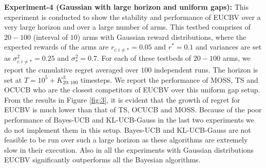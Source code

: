 \textbf{Experiment-4 (Gaussian with large horizon and uniform gaps):} This experiment is conducted to show the stability and performance of EUCBV over a very large horizon and over a large number of arms. This testbed comprises of $20-100$ (interval of $10$) arms with Gaussian reward distributions, where the expected rewards of the arms are $r_{i:i\neq {*}}=0.05$ and $r^{*}=0.1$ and variances are set as $\sigma_{i:i\neq *}^{2}=0.25$ and $\sigma_{*}^{2}=0.7$. For each of these testbeds of $20-100$ arms, we report the cumulative regret averaged over $100$ independent runs. The horizon is set at $T=10^{5} + K_{20:100}^{3}$ timesteps. We report the performance of MOSS, TS and OCUCB who are the closest competitors of EUCBV over this uniform gap setup. From the results in Figure \ref{fig:3}, it is evident that the growth of regret for EUCBV  is much lower than that of TS, OCUCB and MOSS. Because of the poor performance of Bayes-UCB and KL-UCB-Gauss in the last two experiments we do not implement them in this setup.  Bayes-UCB and KL-UCB-Gauss are not feasible to be run over such a large horizon as these algorithms are extremely slow in their execution. Also in all the experiments with Gaussian distributions EUCBV significantly outperforms all the Bayesian algorithms.


